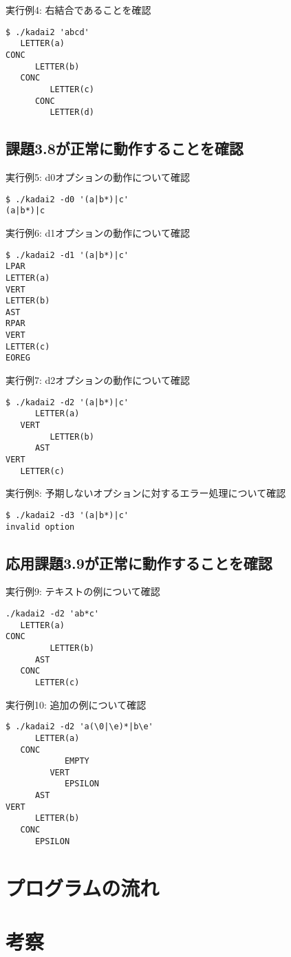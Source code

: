 \documentclass{jsarticle}
\theoremstyle{plain}
\begin{document}
実行例4: 右結合であることを確認
\begin{lstlisting}
$ ./kadai2 'abcd'
   LETTER(a)
CONC
      LETTER(b)
   CONC
         LETTER(c)
      CONC
         LETTER(d)
\end{lstlisting}


\subsection*{課題3.8が正常に動作することを確認}

実行例5: d0オプションの動作について確認
\begin{lstlisting}
$ ./kadai2 -d0 '(a|b*)|c'
(a|b*)|c
\end{lstlisting}

実行例6: d1オプションの動作について確認
\begin{lstlisting}
$ ./kadai2 -d1 '(a|b*)|c'
LPAR
LETTER(a)
VERT
LETTER(b)
AST
RPAR
VERT
LETTER(c)
EOREG
\end{lstlisting}

実行例7: d2オプションの動作について確認
\begin{lstlisting}
$ ./kadai2 -d2 '(a|b*)|c'
      LETTER(a)
   VERT
         LETTER(b)
      AST
VERT
   LETTER(c)
\end{lstlisting}

実行例8: 予期しないオプションに対するエラー処理について確認
\begin{lstlisting}
$ ./kadai2 -d3 '(a|b*)|c'
invalid option
\end{lstlisting}

\subsection{応用課題3.9が正常に動作することを確認}


実行例9: テキストの例について確認
\begin{lstlisting}
./kadai2 -d2 'ab*c'
   LETTER(a)
CONC
         LETTER(b)
      AST
   CONC
      LETTER(c)
\end{lstlisting}

実行例10: 追加の例について確認
\begin{lstlisting}
$ ./kadai2 -d2 'a(\0|\e)*|b\e'
      LETTER(a)
   CONC
            EMPTY
         VERT
            EPSILON
      AST
VERT
      LETTER(b)
   CONC
      EPSILON
\end{lstlisting}



\section{プログラムの流れ}



\section{考察}
\end{document}
